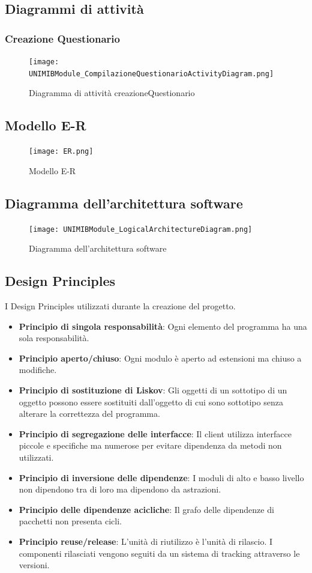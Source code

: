 \documentclass[12pt]{article}
\begin{document}
	\subsection{Diagrammi di attivit\`{a}}
	\subsubsection{Creazione Questionario}
	\begin{figure}[H]
		\centering
		\texttt{[image: UNIMIBModule\_CompilazioneQuestionarioActivityDiagram.png]}
		\caption{Diagramma di attività creazioneQuestionario}
	\end{figure}
	\subsection{Modello E-R}
	\begin{figure}[H]
		\texttt{[image: ER.png]}
		\caption{Modello E-R}
	\end{figure}
	\subsection{Diagramma dell'architettura software}
	\begin{figure}[H]
		\centering
		\texttt{[image: UNIMIBModule\_LogicalArchitectureDiagram.png]}
		\caption{Diagramma dell'architettura software}
	\end{figure}
	\subsection{Design Principles}
	I Design Principles utilizzati durante la creazione del progetto.
	\begin{itemize}
		\item \textbf{Principio di singola responsabilità}: Ogni elemento del programma ha una sola responsabilità.
		\item \textbf{Principio aperto/chiuso}: Ogni modulo è aperto ad estensioni ma chiuso a modifiche.
		\item \textbf{Principio di sostituzione di Liskov}: Gli oggetti di un sottotipo di un oggetto possono essere sostituiti dall'oggetto di cui sono sottotipo senza alterare la correttezza del programma.
		\item \textbf{Principio di segregazione delle interfacce}: Il client utilizza interfacce piccole e specifiche ma numerose per evitare dipendenza da metodi non utilizzati.
		\item \textbf{Principio di inversione delle dipendenze}: I moduli di alto e basso livello non dipendono tra di loro ma dipendono da astrazioni.
		\item \textbf{Principio delle dipendenze acicliche}: Il grafo delle dipendenze di pacchetti non presenta cicli.
		\item \textbf{Principio reuse/release}: L'unità di riutilizzo è l'unità di rilascio. I componenti rilasciati vengono seguiti da un sistema di tracking attraverso le versioni.
	\end{itemize}
\end{document}

